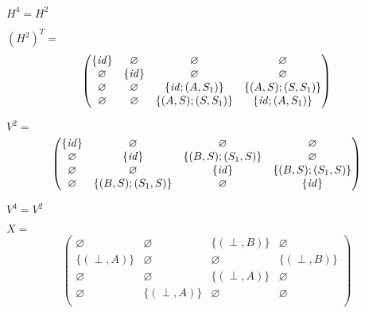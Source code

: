 $H^4 = H^2$

$(H^2)^T=$
\begin{align*}
\begin{pmatrix}
      \{ \text{\emph{id}} \} & \varnothing            & \varnothing            & \varnothing            \\
      \varnothing            & \{ \text{\emph{id}} \} & \varnothing            & \varnothing            \\
      \varnothing            & \varnothing            & \{ \text{\emph{id}}; (A,S_1) \} & \{(A,S);(S,S_1)\}      \\
      \varnothing            & \varnothing            & \{(A,S);(S,S_1)\}      & \{ \text{\emph{id}}; (A,S_1) \}  \\
\end{pmatrix}
\end{align*}



$V^2=$
\begin{align*}
\begin{pmatrix}
      \{ \text{\emph{id}} \}       & \varnothing       & \varnothing       & \varnothing  \\ 
      \varnothing       & \{ \text{\emph{id}} \}       & \{(B,S);(S_1,S)\} & \varnothing  \\
      \varnothing       & \varnothing       & \{ \text{\emph{id}} \}       & \{(B,S);(S_1,S)\}  \\
      \varnothing       & \{(B,S);(S_1,S)\} & \varnothing       & \{ \text{\emph{id}} \}  \\
\end{pmatrix}
\end{align*}

$V^4 = V^2$


$X=$
\begin{align*}
\begin{pmatrix}
      \varnothing            & \varnothing            & \{ (\perp,B) \}            & \varnothing            \\
      \{ (\perp,A) \}        & \varnothing            & \varnothing                & \{ (\perp,B) \}            \\
      \varnothing            & \varnothing            & \{ (\perp,A) \}            & \varnothing      \\
      \varnothing            & \{ (\perp,A) \}            & \varnothing      & \varnothing  \\
\end{pmatrix}
\end{align*}

